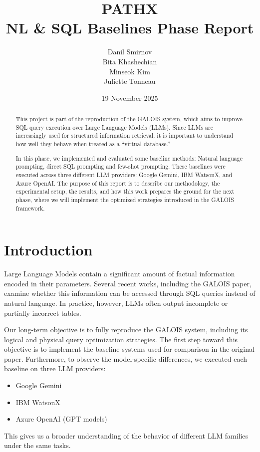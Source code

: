 \documentclass[12pt]{article}
\title{PATHX \\ \large NL \& SQL Baselines Phase Report}
\author{
    Danil Smirnov \\
    Bita Khashechian \\
    Minseok Kim \\
    Juliette Tonneau
}
\date{19 November 2025}
\begin{document}
\maketitle

\begin{abstract}
This project is part of the reproduction of the GALOIS system, which aims to improve SQL query execution over Large Language Models (LLMs). Since LLMs are increasingly used for structured information retrieval, it is important to understand how well they behave when treated as a ``virtual database.''

In this phase, we implemented and evaluated some baseline methods: Natural language prompting, direct SQL prompting and few-shot prompting. These baselines were executed across three different LLM providers: Google Gemini, IBM WatsonX, and Azure OpenAI. The purpose of this report is to describe our methodology, the experimental setup, the results, and how this work prepares the ground for the next phase, where we will implement the optimized strategies introduced in the GALOIS framework.
\end{abstract}

\section{Introduction}

Large Language Models contain a significant amount of factual information encoded in their parameters. Several recent works, including the GALOIS paper, examine whether this information can be accessed through SQL queries instead of natural language. In practice, however, LLMs often output incomplete or partially incorrect tables.

Our long-term objective is to fully reproduce the GALOIS system, including its logical and physical query optimization strategies. The first step toward this objective is to implement the baseline systems used for comparison in the original paper. Furthermore, to observe the model-specific differences, we executed each baseline on three LLM providers:

\begin{itemize}
    \item Google Gemini
    \item IBM WatsonX
    \item Azure OpenAI (GPT models)
\end{itemize}

This gives us a broader understanding of the behavior of different LLM families under the same tasks.
\end{document}
